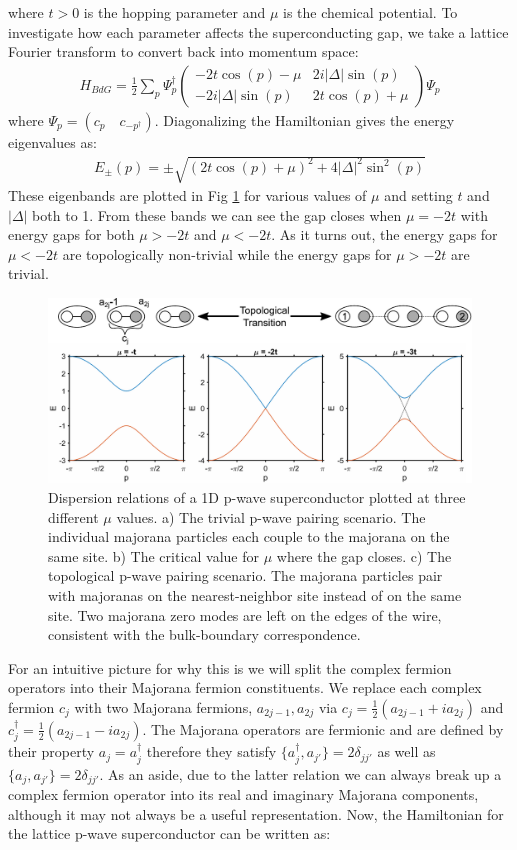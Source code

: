 where $t>0$ is the hopping parameter and $\mu$ is the chemical potential. To investigate how each parameter affects the superconducting gap, we take a lattice Fourier transform to convert back into momentum space:
\begin{align}
	H_{BdG} = \frac{1}{2}\sum_{p}\Psi_{p}^{\dagger}
	\begin{pmatrix}
		-2t\cos(p)-\mu & 2i|\Delta|\sin(p)\\
		-2i|\Delta|\sin(p) & 2t\cos(p)+\mu
	\end{pmatrix}
	\Psi_{p}
\end{align}
where $\Psi_{p}=(c_{p}\quad c_{-p^{\dagger}})$. Diagonalizing the Hamiltonian gives the energy eigenvalues as:
\begin{align}
	E_{\pm}(p) = \pm\sqrt{(2t\cos(p)+\mu)^{2}+4|\Delta|^{2}\sin^{2}(p)}
\end{align}
These eigenbands are plotted in Fig \ref{fig:pwavesc} for various values of $\mu$ and setting $t$ and $|\Delta|$ both to 1. From these bands we can see the gap closes when $\mu=-2t$ with energy gaps for both $\mu>-2t$ and $\mu<-2t$. As it turns out, the energy gaps for $\mu < -2t$ are topologically non-trivial while the energy gaps for $\mu > -2t$ are trivial.
\begin{figure}
	\centering
	\includegraphics[width=\textwidth]{Intro/Figures/PWave_SC.pdf}
	\caption{Dispersion relations of a 1D p-wave superconductor plotted at three different $\mu$ values. a) The trivial p-wave pairing scenario. The individual majorana particles each couple to the majorana on the same site. b) The critical value for $\mu$ where the gap closes. c) The topological p-wave pairing scenario. The majorana particles pair with majoranas on the nearest-neighbor site instead of on the same site. Two majorana zero modes are left on the edges of the wire, consistent with the bulk-boundary correspondence.}
	\label{fig:pwavesc}
\end{figure}
For an intuitive picture for why this is we will split the complex fermion operators into their Majorana fermion constituents. We replace each complex fermion $c_{j}$ with two Majorana fermions, $a_{2j-1},a_{2j}$ via $c_{j}=\frac{1}{2}(a_{2j-1}+ia_{2j})$ and $c_{j}^{\dagger}=\frac{1}{2}(a_{2j-1}-ia_{2j})$. The Majorana operators are fermionic and are defined by their property $a_{j}=a_{j}^{\dagger}$ therefore they satisfy $\{a_{j}^{\dagger},a_{j'}\}=2\delta_{jj'}$ as well as $\{a_{j},a_{j'}\}=2\delta_{jj'}$. As an aside, due to the latter relation we can always break up a complex fermion operator into its real and imaginary Majorana components, although it may not always be a useful representation. Now, the Hamiltonian for the lattice p-wave superconductor can be written as:
